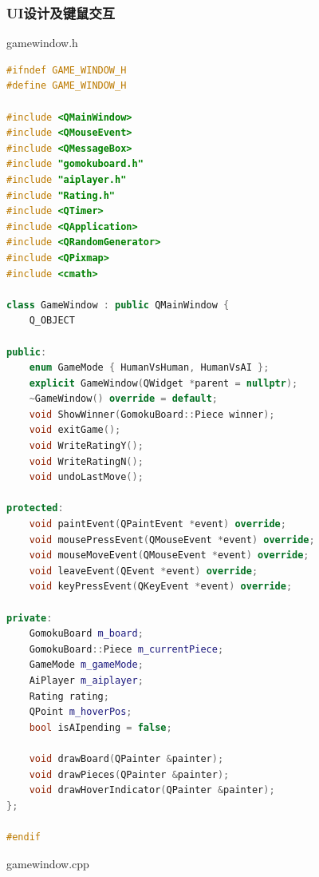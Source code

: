 \documentclass[UTF8]{ctexart}
\begin{document}
\subsubsection{UI设计及键鼠交互}
gamewindow.h
\begin{lstlisting}[language=C++]
#ifndef GAME_WINDOW_H
#define GAME_WINDOW_H

#include <QMainWindow>
#include <QMouseEvent>
#include <QMessageBox>
#include "gomokuboard.h"
#include "aiplayer.h"
#include "Rating.h"
#include <QTimer>
#include <QApplication>
#include <QRandomGenerator>
#include <QPixmap>
#include <cmath>

class GameWindow : public QMainWindow {
    Q_OBJECT 

public:
    enum GameMode { HumanVsHuman, HumanVsAI };
    explicit GameWindow(QWidget *parent = nullptr);
    ~GameWindow() override = default;
    void ShowWinner(GomokuBoard::Piece winner);
    void exitGame();
    void WriteRatingY();
    void WriteRatingN();
	void undoLastMove();

protected:
    void paintEvent(QPaintEvent *event) override;
    void mousePressEvent(QMouseEvent *event) override;
    void mouseMoveEvent(QMouseEvent *event) override;
    void leaveEvent(QEvent *event) override;
	void keyPressEvent(QKeyEvent *event) override;

private:
    GomokuBoard m_board;
    GomokuBoard::Piece m_currentPiece;
    GameMode m_gameMode;
    AiPlayer m_aiplayer;
    Rating rating;
    QPoint m_hoverPos;
	bool isAIpending = false;
	
    void drawBoard(QPainter &painter);
    void drawPieces(QPainter &painter);
    void drawHoverIndicator(QPainter &painter);
};

#endif
\end{lstlisting}
gamewindow.cpp
\end{document}
